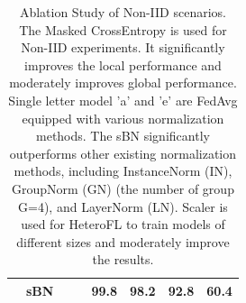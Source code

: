 \documentclass{article} %
\begin{document}
\begin{table}[hbtp]
\begin{tabular}{@{}cccccccc@{}}
                      & sBN  &                      &                    & \textbf{99.8} & 98.2          & \textbf{92.8} & \textbf{60.4} \\ \bottomrule
\end{tabular}
\caption{Ablation Study of Non-IID scenarios. The Masked CrossEntropy is used for Non-IID experiments. It significantly improves the local performance and moderately improves global performance. Single letter model 'a' and 'e' are FedAvg equipped with various normalization methods. The sBN significantly outperforms other existing normalization methods, including InstanceNorm (IN), GroupNorm (GN) (the number of group G=4), and LayerNorm (LN). Scaler is used for HeteroFL to train models of different sizes and moderately improve the results.}
\label{tab:ablation_non-iid}
\end{table}
\end{document}
